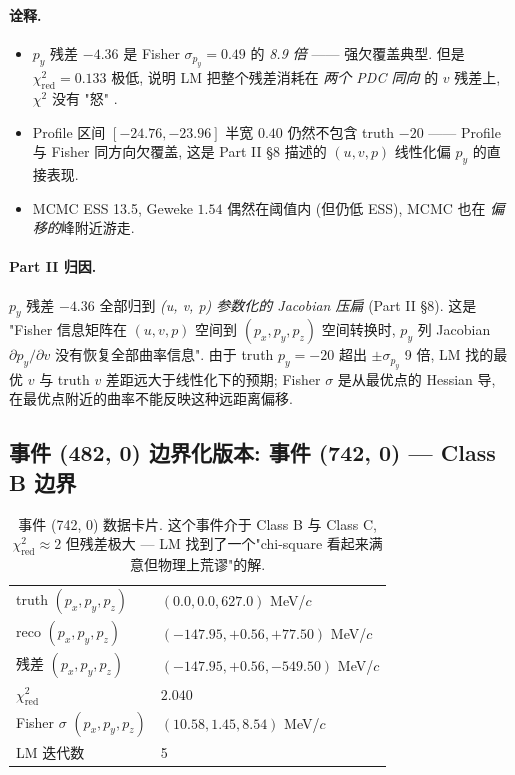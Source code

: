 \paragraph{诠释.}
\begin{itemize}[nosep]
  \item $p_y$ 残差 $-4.36$ 是 Fisher $\sigma_{p_y} = 0.49$ 的 \emph{8.9 倍} —— 强欠覆盖典型. 但是 $\chi^2_{\mathrm{red}} = 0.133$ 极低, 说明 LM 把整个残差消耗在 \emph{两个 PDC 同向} 的 $v$ 残差上, $\chi^2$ 没有 "怒"
.
  \item Profile 区间 $[-24.76, -23.96]$ 半宽 $0.40$ 仍然不包含 truth $-20$ —— Profile 与 Fisher 同方向欠覆盖, 这是 Part II §8 描述的 $(u, v, p)$ 线性化偏 $p_y$ 的直接表现.
  \item MCMC ESS 13.5, Geweke $1.54$ 偶然在阈值内 (但仍低 ESS), MCMC 也在 \emph{偏移的}峰附近游走.
\end{itemize}

\paragraph{Part II 归因.}
$p_y$ 残差 $-4.36$ 全部归到 \emph{(u, v, p) 参数化的 Jacobian 压扁} (Part II §8). 这是 "Fisher 信息矩阵在 $(u, v, p)$ 空间到 $(p_x, p_y, p_z)$ 空间转换时, $p_y$ 列 Jacobian $\partial p_y / \partial v$ 没有恢复全部曲率信息". 由于 truth $p_y = -20$ 超出 $\pm \sigma_{p_y}$ 9 倍, LM 找的最优 $v$ 与 truth $v$ 差距远大于线性化下的预期; Fisher $\sigma$ 是从最优点的 Hessian 导, 在最优点附近的曲率不能反映这种远距离偏移.

\subsection{事件 (482, 0) 边界化版本: 事件 (742, 0) — Class B 边界}
\label{sec:partIII:case_studies:event_742}

\begin{table}[H]
\centering\small
\caption{事件 (742, 0) 数据卡片. 这个事件介于 Class B 与 Class C, $\chi^2_{\mathrm{red}} \approx 2$ 但残差极大 — LM 找到了一个"chi-square 看起来满意但物理上荒谬"的解.}
\begin{tabular}{ll}
\toprule
truth $(p_x, p_y, p_z)$ & $(0.0, 0.0, 627.0)$ MeV/$c$ \\
reco $(p_x, p_y, p_z)$ & $(-147.95, +0.56, +77.50)$ MeV/$c$ \\
残差 $(p_x, p_y, p_z)$ & $(-147.95, +0.56, -549.50)$ MeV/$c$ \\
$\chi^2_{\mathrm{red}}$ & $2.040$ \\
Fisher $\sigma$ $(p_x, p_y, p_z)$ & $(10.58, 1.45, 8.54)$ MeV/$c$ \\
LM 迭代数 & 5 \\
\bottomrule
\end{tabular}
\end{table}

